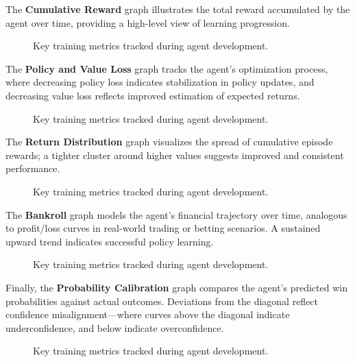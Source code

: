 \documentclass[sigconf]{acmart}
\begin{document}
The \textbf{Cumulative Reward} graph illustrates the total reward accumulated by the agent over time, providing a high-level view of learning progression. 

\begin{figure}[ht]
  \centering
  \caption{Key training metrics tracked during agent development.}
  \label{fig:training_metrics}
\end{figure}

The \textbf{Policy and Value Loss} graph tracks the agent's optimization process, where decreasing policy loss indicates stabilization in policy updates, and decreasing value loss reflects improved estimation of expected returns. 

\begin{figure}[ht]
  \centering
  \caption{Key training metrics tracked during agent development.}
  \label{fig:training_metrics}
\end{figure}

The \textbf{Return Distribution} graph visualizes the spread of cumulative episode rewards; a tighter cluster around higher values suggests improved and consistent performance. 

\begin{figure}[ht]
  \centering
  \caption{Key training metrics tracked during agent development.}
  \label{fig:training_metrics}
\end{figure}

The \textbf{Bankroll} graph models the agent's financial trajectory over time, analogous to profit/loss curves in real-world trading or betting scenarios. A sustained upward trend indicates successful policy learning. 

\begin{figure}[ht]
  \centering
  \caption{Key training metrics tracked during agent development.}
  \label{fig:training_metrics}
\end{figure}

Finally, the \textbf{Probability Calibration} graph compares the agent's predicted win probabilities against actual outcomes. Deviations from the diagonal reflect confidence misalignment—where curves above the diagonal indicate underconfidence, and below indicate overconfidence.

\begin{figure}[ht]
  \centering
  \caption{Key training metrics tracked during agent development.}
  \label{fig:training_metrics}
\end{figure}
\end{document}
